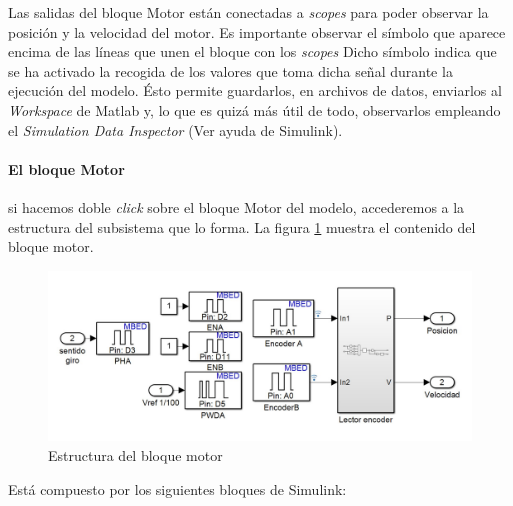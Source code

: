 \documentclass[10pt,a4paper]{report}
\begin{document}
Las salidas del bloque Motor están conectadas a \emph{scopes} para poder observar la posición y la velocidad del motor. Es importante observar el símbolo que aparece encima de las líneas que unen el bloque con los \emph{scopes} Dicho símbolo  indica que se ha activado la recogida de los valores que toma dicha señal durante la ejecución del modelo. Ésto permite guardarlos, en archivos de datos, enviarlos al \emph{Workspace} de Matlab y, lo que es quizá más útil de todo, observarlos empleando el \emph{Simulation Data Inspector} (Ver ayuda de Simulink).
 
\paragraph{El bloque Motor}
si hacemos doble \emph{click} sobre el bloque Motor del modelo, accederemos a la estructura del subsistema que lo forma. La figura \ref{f19} muestra el contenido del bloque motor.
\begin{figure}
\includegraphics[width=\textwidth]{la2.jpg}
\caption{Estructura del bloque motor}\label{f19}
\end{figure}
Está compuesto por los siguientes bloques de Simulink:
\end{document}
